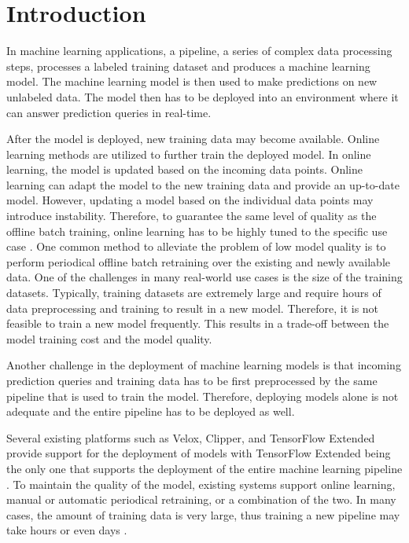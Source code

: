 \section{Introduction} \label{introduction}
In machine learning applications, a pipeline, a series of complex data processing steps, processes a labeled training dataset and produces a machine learning model.
The machine learning model is then used to make predictions on new unlabeled data.
The model then has to be deployed into an environment where it can answer prediction queries in real-time.

After the model is deployed, new training data may become available.
Online learning methods are utilized to further train the deployed model.
In online learning, the model is updated based on the incoming data points.
Online learning can adapt the model to the new training data and provide an up-to-date model.
However, updating a model based on the individual data points may introduce instability.
Therefore, to guarantee the same level of quality as the offline batch training, online learning has to be highly tuned to the specific use case \cite{ma2009identifying, macmahan2013}.
One common method to alleviate the problem of low model quality is to perform periodical offline batch retraining over the existing and newly available data.
One of the challenges in many real-world use cases is the size of the training datasets.
Typically, training datasets are extremely large and require hours of data preprocessing and training to result in a new model.
Therefore, it is not feasible to train a new model frequently.
This results in a trade-off between the model training cost and the model quality.

Another challenge in the deployment of machine learning models is that incoming prediction queries and training data has to be first preprocessed by the same pipeline that is used to train the model.
Therefore, deploying models alone is not adequate and the entire pipeline has to be deployed as well.

Several existing platforms such as Velox, Clipper, and TensorFlow Extended provide support for the deployment of models with TensorFlow Extended being the only one that supports the deployment of the entire machine learning pipeline \cite{crankshaw2014missing, crankshaw2016clipper, agarwal2014laser, baylor2017tfx}.
To maintain the quality of the model, existing systems support online learning, manual or automatic periodical retraining, or a combination of the two.
In many cases, the amount of training data is very large, thus training a new pipeline may take hours or even days \cite{baylor2017tfx}.

